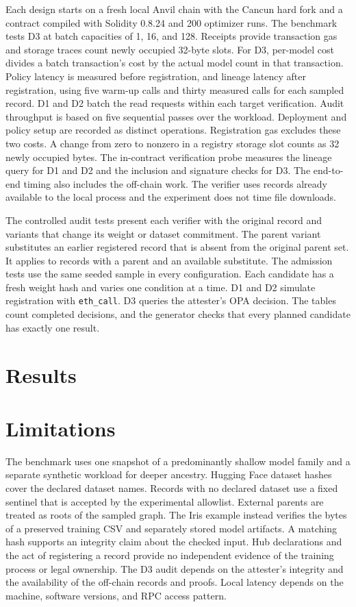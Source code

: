 \documentclass[conference]{IEEEtran}
\begin{document}
Each design starts on a fresh local Anvil chain with the Cancun hard fork
and a contract compiled with Solidity 0.8.24 and 200 optimizer runs.
The benchmark tests D3 at batch capacities of 1, 16, and 128. Receipts
provide transaction gas and storage traces count newly occupied
32-byte slots. For D3, per-model cost divides a batch transaction's
cost by the actual model count in that transaction. Policy latency is
measured before registration, and lineage latency after registration,
using five warm-up calls and thirty measured calls for each sampled
record. D1 and D2 batch the read requests within each target verification.
Audit throughput is based on five sequential passes over the workload.
Deployment and policy setup are recorded as distinct operations.
Registration gas excludes these two costs. A change from zero to nonzero
in a registry storage slot counts as 32 newly occupied bytes. The
in-contract verification probe measures the lineage query for D1 and
D2 and the inclusion and signature checks for D3. The end-to-end timing
also includes the off-chain work. The verifier uses records already
available to the local process and the experiment does not time file
downloads.

The controlled audit tests present each verifier with the original record
and variants that change its weight or dataset commitment. The parent
variant substitutes an earlier registered record that is absent from the
original parent set. It applies to records with a parent and an available
substitute. The admission tests use the same seeded sample in every
configuration. Each candidate has a fresh weight hash and varies one
condition at a time. D1 and D2 simulate registration with
\texttt{eth\_call}. D3 queries the attester's OPA decision. The tables
count completed decisions, and the generator checks that every planned
candidate has exactly one result.

\section{Results}


\section{Limitations}
The benchmark uses one snapshot of a predominantly shallow model family
and a separate synthetic workload for deeper ancestry. Hugging Face
dataset hashes cover the declared dataset names. Records with no declared
dataset use a fixed sentinel that is accepted by the experimental
allowlist. External parents are treated as roots of the sampled graph.
The Iris example instead
verifies the bytes of a preserved training CSV and separately stored model
artifacts. A matching hash supports an integrity claim about the checked
input. Hub declarations and the act of registering a record provide no
independent evidence of the training process or legal ownership. The D3
audit depends on the attester's integrity and the availability of the
off-chain records and proofs. Local latency depends on the machine,
software versions, and RPC access pattern.
\end{document}

